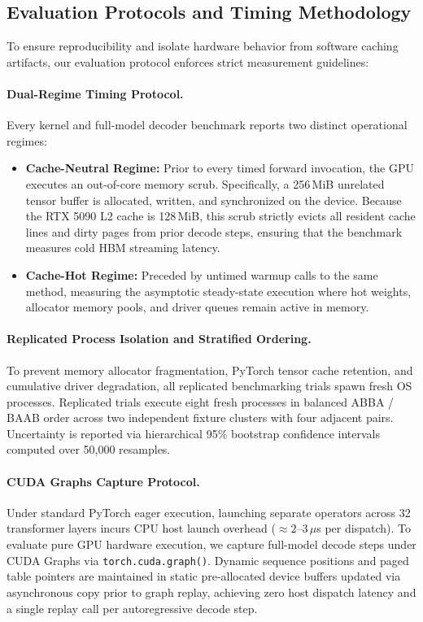 \documentclass{article}
\begin{document}
\subsection{Evaluation Protocols and Timing Methodology}
To ensure reproducibility and isolate hardware behavior from software caching artifacts, our evaluation protocol enforces strict measurement guidelines:

\paragraph{Dual-Regime Timing Protocol.}
Every kernel and full-model decoder benchmark reports two distinct operational regimes:
\begin{itemize}
    \item \textbf{Cache-Neutral Regime:} Prior to every timed forward invocation, the GPU executes an out-of-core memory scrub. Specifically, a 256\,MiB unrelated tensor buffer is allocated, written, and synchronized on the device. Because the RTX 5090 L2 cache is 128\,MiB, this scrub strictly evicts all resident cache lines and dirty pages from prior decode steps, ensuring that the benchmark measures cold HBM streaming latency.
    \item \textbf{Cache-Hot Regime:} Preceded by untimed warmup calls to the same method, measuring the asymptotic steady-state execution where hot weights, allocator memory pools, and driver queues remain active in memory.
\end{itemize}

\paragraph{Replicated Process Isolation and Stratified Ordering.}
To prevent memory allocator fragmentation, PyTorch tensor cache retention, and cumulative driver degradation, all replicated benchmarking trials spawn fresh OS processes. Replicated trials execute eight fresh processes in balanced ABBA / BAAB order across two independent fixture clusters with four adjacent pairs. Uncertainty is reported via hierarchical 95\% bootstrap confidence intervals computed over 50,000 resamples.

\paragraph{CUDA Graphs Capture Protocol.}
Under standard PyTorch eager execution, launching separate operators across 32 transformer layers incurs CPU host launch overhead ($\approx 2$--$3\,\mu$s per dispatch). To evaluate pure GPU hardware execution, we capture full-model decode steps under CUDA Graphs via \texttt{torch.cuda.graph()}. Dynamic sequence positions and paged table pointers are maintained in static pre-allocated device buffers updated via asynchronous copy prior to graph replay, achieving zero host dispatch latency and a single replay call per autoregressive decode step.
\end{document}
